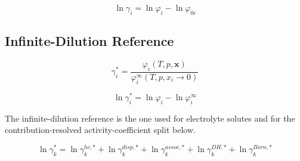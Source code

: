 \documentclass[12pt, letterpaper]{article}
\begin{document}
\begin{equation}
    \ln\gamma_{i}
    =
    \ln\varphi_{i}
    -
    \ln\varphi_{0i}
    \label{eq:lngamma_sym}
\end{equation}

\subsection{Infinite-Dilution Reference}


\begin{equation}
    \gamma_{i}^{*}
    =
    \frac{\varphi_{i}(T,p,\mathbf{x})}{\varphi_{i}^{\infty}(T,p,x_{i}\to 0)}
    \label{eq:gamma_asym_inf}
\end{equation}


\begin{equation}
    \ln\gamma_{i}^{*}
    =
    \ln\varphi_{i}
    -
    \ln\varphi_{i}^{\infty}
    \label{eq:lngamma_asym_inf}
\end{equation}

The infinite-dilution reference is the one used for electrolyte solutes and for the contribution-resolved activity-coefficient split below.


\begin{equation}
    \ln\gamma_{k}^{*}
    =
    \ln\gamma_{k}^{hc,*}
    +
    \ln\gamma_{k}^{disp,*}
    +
    \ln\gamma_{k}^{assoc,*}
    +
    \ln\gamma_{k}^{DH,*}
    +
    \ln\gamma_{k}^{Born,*}
    \label{eq:lngamma_asym_sum}
\end{equation}
\end{document}
